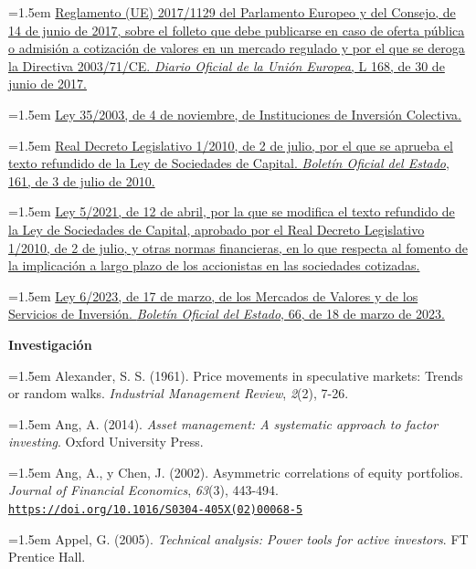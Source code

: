 \documentclass[10pt,a4paper]{article}
\begin{document}
\noindent\hangindent=1.5em \href{https://eur-lex.europa.eu/eli/reg/2017/1129/oj}{Reglamento (UE) 2017/1129 del Parlamento Europeo y del Consejo, de 14 de junio de 2017, sobre el folleto que debe publicarse en caso de oferta pública o admisión a cotización de valores en un mercado regulado y por el que se deroga la Directiva 2003/71/CE. \textit{Diario Oficial de la Unión Europea}, L 168, de 30 de junio de 2017.}

\noindent\hangindent=1.5em \href{https://www.boe.es/eli/es/l/2003/11/04/35/con}{Ley 35/2003, de 4 de noviembre, de Instituciones de Inversión Colectiva.}

\noindent\hangindent=1.5em \href{https://www.boe.es/eli/es/rdlg/2010/07/02/1/con}{Real Decreto Legislativo 1/2010, de 2 de julio, por el que se aprueba el texto refundido de la Ley de Sociedades de Capital. \textit{Boletín Oficial del Estado}, 161, de 3 de julio de 2010.}

\noindent\hangindent=1.5em \href{https://www.boe.es/eli/es/l/2021/04/12/5/con}{Ley 5/2021, de 12 de abril, por la que se modifica el texto refundido de la Ley de Sociedades de Capital, aprobado por el Real Decreto Legislativo 1/2010, de 2 de julio, y otras normas financieras, en lo que respecta al fomento de la implicación a largo plazo de los accionistas en las sociedades cotizadas.}

\noindent\hangindent=1.5em \href{https://www.boe.es/eli/es/l/2023/03/17/6/con}{Ley 6/2023, de 17 de marzo, de los Mercados de Valores y de los Servicios de Inversión. \textit{Boletín Oficial del Estado}, 66, de 18 de marzo de 2023.}

\textbf{Investigación}

\noindent\hangindent=1.5em Alexander, S. S. (1961). Price movements in speculative markets: Trends or random walks. \textit{Industrial Management Review}, \textit{2}(2), 7-26.

\noindent\hangindent=1.5em Ang, A. (2014). \textit{Asset management: A systematic approach to factor investing}. Oxford University Press.

\noindent\hangindent=1.5em Ang, A., y Chen, J. (2002). Asymmetric correlations of equity portfolios. \textit{Journal of Financial Economics}, \textit{63}(3), 443-494. \href{https://doi.org/10.1016/S0304-405X(02)00068-5}{\nolinkurl{https://doi.org/10.1016/S0304-405X(02)00068-5}}

\noindent\hangindent=1.5em Appel, G. (2005). \textit{Technical analysis: Power tools for active investors}. FT Prentice Hall.
\end{document}
